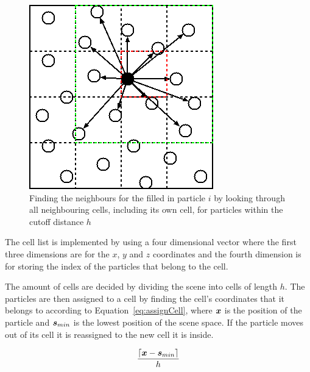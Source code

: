     \begin{figure}[h!]\centering
    \begin{centering}
    \includegraphics[width=0.7\linewidth]{img/CellList.png}
    \caption{Finding the neighbours for the filled in particle $i$ by looking through all neighbouring cells, including its own cell, for particles within the cutoff distance $h$}
    \label{fig:cellList}
    \end{centering}
    \end{figure}

    The cell list is implemented by using a four dimensional vector where the first three dimensions are for the $x$, $y$ and $z$ coordinates and the fourth dimension is for storing the index of the particles that belong to the cell.

    The amount of cells are decided by dividing the scene into cells of length $h$.
    The particles are then assigned to a cell by finding the cell's coordinates that it belongs to according to Equation~\ref{eq:assignCell}, where $\bm{x}$ is the position of the particle and $\bm{s}_{min}$ is the lowest position of the scene space.
    If the particle moves out of its cell it is reassigned to the new cell it is inside.

    \begin{equation} \label{eq:assignCell}
        \frac{\lceil{\bm{x} - \bm{s}_{min}}\rceil}{h}
    \end{equation}

